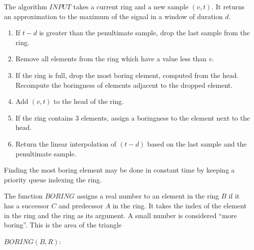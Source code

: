 \documentclass[11pt]{article}
\begin{document}
The algorithm $INPUT$ takes a current ring and a new sample $(v,t)$.
It returns an approximation to the maximum of the signal in a window of
duration $d$.

\begin{enumerate}
\item If $t-d$ is greater than the penultimate sample,
  drop the last sample from the ring.
\item Remove all elements from the ring which have a value
  less than $v$.
\item If the ring is full, drop the most boring element,
  computed from the head. Recompute the boringness of elements
  adjacent to the dropped element.
\item Add $(v,t)$ to the head of the ring.
\item If the ring contains 3 elements, assign a boringness
  to the element next to the head.
\item Return the linear interpolation of $(t-d)$ based
  on the last sample and the penultimate sample.
\end{enumerate}

Finding the most boring element may be done in constant time
by keeping a priority queue indexing the ring.

The function $BORING$ assigns a real number to an
element in the ring $B$ if it has a successor $C$ and predecssor $A$
in the ring. It takes the index of the element in the ring
and the ring as its argument. A small number is
considered ``more boring''. This is the area of
the triangle

$BORING(B,R)$:









\end{document}
